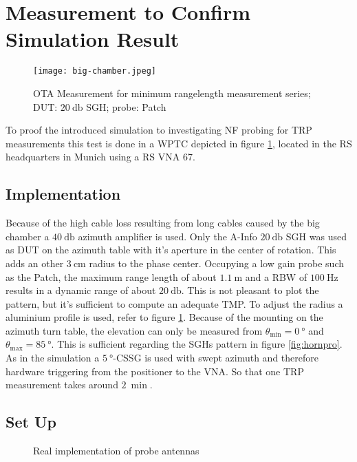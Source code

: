 \section{Measurement to Confirm Simulation Result}

\begin{figure}[H]
\centering
\texttt{[image: big-chamber.jpeg]}
\caption{OTA Measurement for minimum rangelength measurement series; DUT: $\SI{20}{\decibel}$ SGH; probe: Patch}
\label{fig:otameas}
\end{figure}

To proof the introduced simulation to investigating \ac{NF} probing for \ac{TRP} measurements this test is done in a \ac{WPTC} depicted in figure \ref{fig:otameas}, located in the \ac{RS} headquarters in Munich using a \ac{RS} \ac{VNA} 67.

\subsection{Implementation}

 Because of the high cable loss resulting from long cables caused by the big chamber a $\SI{40}{\decibel}$ azimuth amplifier is used. Only the A-Info $\SI{20}{\decibel}$ \ac{SGH} was used as \ac{DUT} on the azimuth table with it's aperture in the center of rotation. This adds an other $\SI{3}{\centi\meter}$ radius to the phase center. Occupying a low gain probe such as the Patch, the maximum range length of about $\SI{1.1}{\meter}$ and a \ac{RBW} of $\SI{100}{\hertz}$ results in a dynamic range of about $\SI{20}{\decibel}$. This is not pleasant to plot the pattern, but it's sufficient to compute an adequate \ac{TMP}. To adjust the radius a aluminium profile is used, refer to figure \ref{fig:otameas}. Because of the mounting on the azimuth turn table, the elevation can only be measured from $\theta_\text{min}=\SI{0}{\degree}$ and $\theta_\text{max}=\SI{85}{\degree}$. This is sufficient regarding the \ac{SGH}s pattern in figure \ref{fig:hornpro}. As in the simulation a $\SI{5}{\degree}$-\ac{CSSG} is used with swept azimuth and therefore hardware triggering from the positioner to the \ac{VNA}. So that one \ac{TRP} measurement takes around $\SI{2}{\min}$.

\subsection{Set Up}

\begin{figure}[H]
  \centering
  \centering
  \centering
\caption{Real implementation of probe antennas}
\label{fig:realprobe}
\end{figure}

